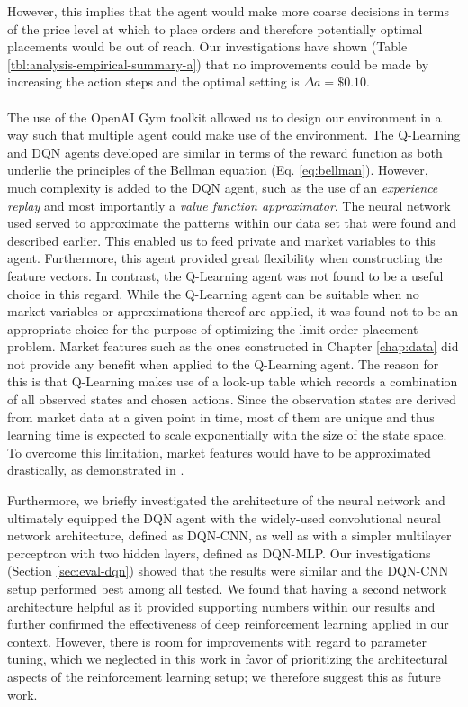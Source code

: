     However, this implies that the agent would make more coarse decisions in terms of the price level at which to place orders and therefore potentially optimal placements would be out of reach.
    Our investigations have shown (Table \ref{tbl:analysis-empirical-summary-a}) that no improvements could be made by increasing the action steps and the optimal setting is $\Delta{a}=\$0.10$.
    \\
    \\
    The use of the OpenAI Gym toolkit\cite{brockman2016openai} allowed us to design our environment in a way such that multiple agent could make use of the environment.
    The Q-Learning and DQN agents developed are similar in terms of the reward function as both underlie the principles of the Bellman equation (Eq. \ref{eq:bellman}).
    However, much complexity is added to the DQN agent, such as the use of an \textit{experience replay} and most importantly a \textit{value function approximator}.
    The neural network used served to approximate the patterns within our data set that were found and described earlier.
    This enabled us to feed private and market variables to this agent.
    Furthermore, this agent provided great flexibility when constructing the feature vectors.
    In contrast, the Q-Learning agent was not found to be a useful choice in this regard.
    While the Q-Learning agent can be suitable when no market variables or approximations thereof are applied, it was found not to be an appropriate choice for the purpose of optimizing the limit order placement problem.
    Market features such as the ones constructed in Chapter \ref{chap:data} did not provide any benefit when applied to the Q-Learning agent.
    The reason for this is that Q-Learning makes use of a look-up table which records a combination of all observed states and chosen actions.
    Since the observation states are derived from market data at a given point in time, most of them are unique and thus learning time is expected to scale exponentially with the size of the state space\cite{whitehead1991complexity, kaelbling1996reinforcement}.
    To overcome this limitation, market features would have to be approximated drastically, as demonstrated in \cite{nevmyvaka2006reinforcement}.
    
    Furthermore, we briefly investigated the architecture of the neural network and ultimately equipped the DQN agent with the widely-used convolutional neural network architecture\cite{mnih2015human}, defined as DQN-CNN, as well as with a simpler multilayer perceptron with two hidden layers, defined as DQN-MLP.
    Our investigations (Section \ref{sec:eval-dqn}) showed that the results were similar and the DQN-CNN setup performed best among all tested.
    We found that having a second network architecture helpful as it provided supporting numbers within our results and further confirmed the effectiveness of deep reinforcement learning applied in our context.
    However, there is room for improvements with regard to parameter tuning, which we neglected in this work in favor of prioritizing the architectural aspects of the reinforcement learning setup; we therefore suggest this as future work.

